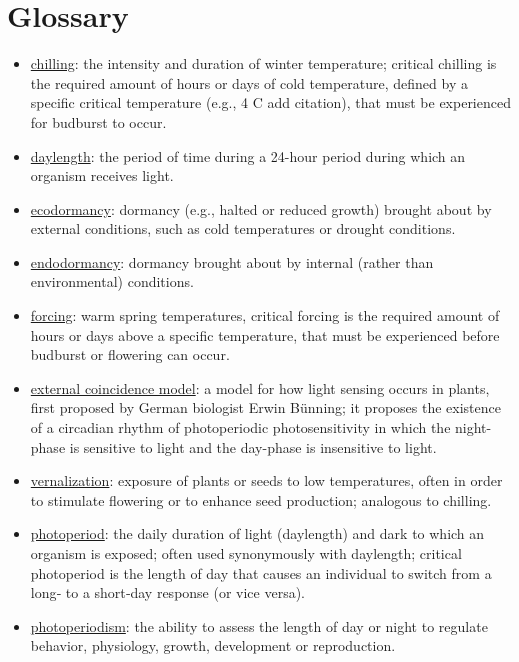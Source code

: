 \documentclass{article}
\begin{document}
\section* {Glossary}
\begin{itemize}
\item \underline{chilling}: the intensity and duration of winter temperature; critical chilling is the required amount of hours or days of cold temperature, defined by a specific critical temperature (e.g., 4 \degree C add citation), that must be experienced for budburst to occur.
\item \underline{daylength}: the period of time during a 24-hour period during which an organism receives light.
\item \underline{ecodormancy}: dormancy (e.g., halted or reduced growth) brought about by external conditions, such as cold temperatures or drought conditions. 
\item \underline{endodormancy}: dormancy brought about by internal (rather than environmental) conditions. 
\item \underline{forcing}: warm spring temperatures, critical forcing is the required amount of hours or days above a specific temperature, that must be experienced before budburst or flowering can occur.
\item \underline{external coincidence model}: a model for how light sensing occurs in plants, first proposed by German biologist Erwin Bünning; it proposes the existence of a circadian rhythm of photoperiodic photosensitivity in which the night-phase is sensitive to light and the day-phase is insensitive to light. 
\item \underline{vernalization}: exposure of plants or seeds to low temperatures, often in order to stimulate flowering or to enhance seed production; analogous to chilling.
\item \underline{photoperiod}: the daily duration of light (daylength) and dark to which an organism is exposed; often used synonymously with daylength; critical photoperiod is the length of day that causes an individual to switch from a long‐ to a short‐day response (or vice versa).
\item \underline{photoperiodism}: the ability to assess the length of day or night to regulate behavior, physiology, growth, development or reproduction.
\end{itemize}
\end{document}

